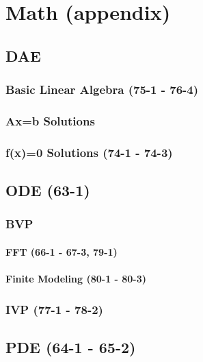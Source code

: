 \documentclass{mitqualif}
\begin{document}
\chapter{Math (appendix)}
\section{DAE}
\subsection{Basic Linear Algebra (75-1 - 76-4)}







\subsection{Ax=b Solutions}
\subsection{f(x)=0 Solutions (74-1 - 74-3)}



\section{ODE (63-1)}

\subsection{BVP}
\subsubsection{FFT (66-1 - 67-3, 79-1)}






\subsubsection{Finite Modeling (80-1 - 80-3)}



\subsection{IVP (77-1 - 78-2)}





\section{PDE (64-1 - 65-2)}




\end{document}
